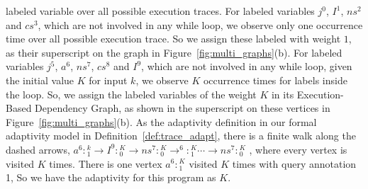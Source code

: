 {labeled variable over all possible execution traces.
For labeled variables $j^0$, $I^1$, $ns^2$ and $cs^3$,
which are not involved in any while loop,
we observe only one occurrence time 
over all possible execution trace.
So we assign these labeled with weight $1$, as their superscript 
on the graph in Figure~\ref{fig:multi_graphs}(b).
For labeled variables $j^5$, $a^6$, $ns^7$, $cs^8$ and $I^9$,
which are not involved in any while loop,
given the initial value $K$ for input $k$, 
we observe $K$ occurrence times
for labels inside the loop.
So, we assign the labeled variables 
 of the weight $K$ in its 
Execution-Based Dependency Graph, as shown in the superscript on these vertices
in Figure~\ref{fig:multi_graphs}(b).
As the adaptivity definition in our formal adaptivity model in Definition~\ref{def:trace_adapt},
there is a finite walk along the dashed arrows,
$a^{6}: {}^k_1 \to I^9:{}^K_0 \to ns^7:{}^K_0\to ^{6}: {}^K_1 \cdots \to ns^7:{}^K_0$ , 
where every vertex is visited $K$ times.
There is one vertex $a^{6}: {}^K_1$ visited $K$ times with query annotation 1, 
So we have the adaptivity for this program as $K$.
}
